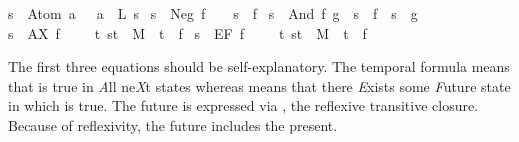 \begin{isabellebody}
\isanewline
{}s\ {}\ Atom\ a\ \ {}\ {}a\ {}\ L\ s{}{}\ {}\isanewline
{}s\ {}\ Neg\ f\ \ \ {}\ {}{}{}s\ {}\ f{}{}{}\ {}\isanewline
{}s\ {}\ And\ f\ g\ {}\ {}s\ {}\ f\ {}\ s\ {}\ g{}{}\ {}\isanewline
{}s\ {}\ AX\ f\ \ \ \ {}\ {}{}t{}\ {}s{}t{}\ {}\ M\ {}\ t\ {}\ f{}{}\ {}\isanewline
{}s\ {}\ EF\ f\ \ \ \ {}\ {}{}t{}\ {}s{}t{}\ {}\ M\ {}\ t\ {}\ f{}{}%
\begin{isamarkuptext}%
\noindent
The first three equations should be self-explanatory. The temporal formula
 means that  is true in \emph{A}ll ne\emph{X}t states whereas
 means that there \emph{E}xists some \emph{F}uture state in which  is
true. The future is expressed via , the reflexive transitive
closure. Because of reflexivity, the future includes the present.


\end{isamarkuptext}
\end{isabellebody}
